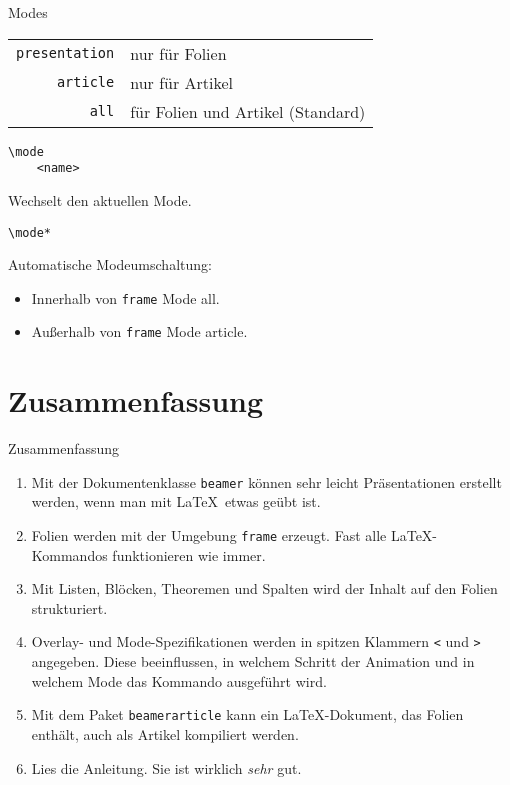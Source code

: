 \begin{Frame}[fragile]{Modes}
  \begin{tabular}{r@{ }l}
    \texttt{presentation} & nur für Folien\\
    \texttt{article} & nur für Artikel\\
    \texttt{all} & für Folien und Artikel (Standard)
  \end{tabular}

  \xxx

  \begin{lstlisting}[gobble=4]
    \mode
    <name>
  \end{lstlisting}
  Wechselt den aktuellen Mode.

  \xxx

  \begin{lstlisting}[gobble=4]
    \mode*
  \end{lstlisting}
  Automatische Modeumschaltung:
  \begin{itemize}
    \item Innerhalb von \lstinline-frame- Mode {all}.
    \item Außerhalb von \lstinline-frame- Mode {article}.
  \end{itemize}
\end{Frame}

\section*{Zusammenfassung}

\begin{frame}[fragile]{Zusammenfassung}
  \begin{enumerate}
    \item Mit der Dokumentenklasse \lstinline-beamer- können \alert{sehr
          leicht Präsentationen erstellt} werden, wenn man mit \LaTeX\ etwas geübt ist.
    \item Folien werden mit der Umgebung \lstinline-frame- erzeugt.
      Fast alle \alert{\LaTeX-Kommandos funktionieren wie immer}.
    \item Mit \alert{Listen, Blöcken, Theoremen und Spalten} wird
      der Inhalt auf den Folien \alert{strukturiert}.
    \item \alert{Overlay- und Mode-Spezifikationen} werden in spitzen
      Klammern \lstinline-<- und \lstinline->- angegeben. Diese beeinflussen, in welchem
      \alert{Schritt der Animation} und in welchem \alert{Mode}
      das Kommando ausgeführt wird.
    \item Mit dem Paket \lstinline-beamerarticle- kann ein \LaTeX-Dokument,
      das Folien enthält, auch \alert{als Artikel kompiliert} werden.
    \item \alert{Lies die Anleitung. Sie ist wirklich \emph{sehr} gut.}
  \end{enumerate}
\end{frame}

